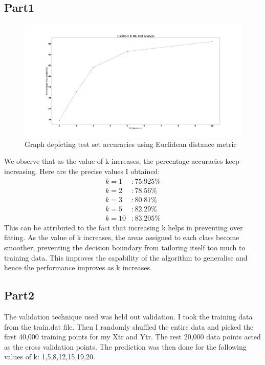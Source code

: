 \documentclass[a4paper,11pt]{article}
\begin{document}
\begin{mlsolution}
\subsection*{Part1}
\begin{figure}[th]%
\centering
\includegraphics[width=1.2\columnwidth]{Q1_6_final.png}%
\caption{Graph depicting test set accuracies using Euclidean distance metric}%
\label{fig:proto}%
\end{figure}
We observe that as the value of k increases, the percentage accuracies keep increasing. Here are the precise values I obtained:
\begin{align}
    k = 1 &: 75.925 \% \\
    k = 2 &: 78.56 \% \\
    k = 3 &: 80.81 \% \\
    k = 5 &: 82.29 \% \\
    k = 10 &: 83.205 \% 
\end{align}
This can be attributed to the fact that increasing k helps in preventing over fitting. As the value of k increases, the areas assigned to each class become smoother, preventing the decision boundary from tailoring itself too much to training data. This improves the capability of the algorithm to generalise and hence the performance improves as k increases. \subsection*{Part2}
The validation technique used was held out validation. I took the training data from the train.dat file. Then I randomly shuffled the entire data and picked the first 40,000 training points for my Xtr and Ytr. The rest 20,000 data points acted as the cross validation points. The prediction was then done for the following values of k: 1,5,8,12,15,19,20.


\end{mlsolution}
\end{document}
